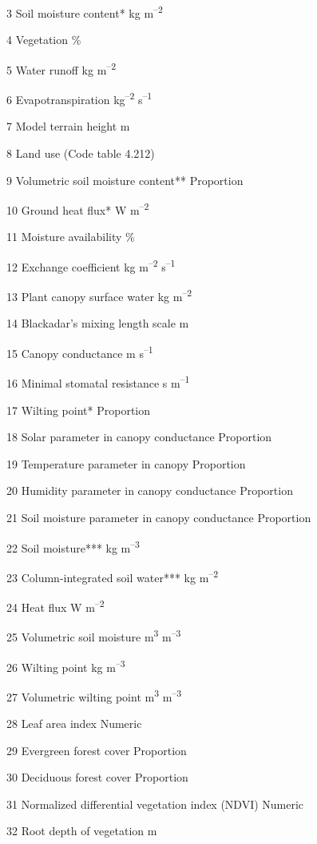 3 Soil moisture content* kg m\textsuperscript{--2}

4 Vegetation \%

5 Water runoff kg m\textsuperscript{--2}

6 Evapotranspiration kg\textsuperscript{--2} s\textsuperscript{--1}

7 Model terrain height m

8 Land use (Code table 4.212)

9 Volumetric soil moisture content** Proportion

10 Ground heat flux* W m\textsuperscript{--2}

11 Moisture availability \%

12 Exchange coefficient kg m\textsuperscript{--2} s\textsuperscript{--1}

13 Plant canopy surface water kg m\textsuperscript{--2}

14 Blackadar's mixing length scale m

15 Canopy conductance m s\textsuperscript{--1}

16 Minimal stomatal resistance s m\textsuperscript{--1}

17 Wilting point* Proportion

18 Solar parameter in canopy conductance Proportion

19 Temperature parameter in canopy Proportion

20 Humidity parameter in canopy conductance Proportion

21 Soil moisture parameter in canopy conductance Proportion

22 Soil moisture*** kg m\textsuperscript{--3}

23 Column-integrated soil water*** kg m\textsuperscript{--2}

24 Heat flux W m\textsuperscript{--2}

25 Volumetric soil moisture m\textsuperscript{3} m\textsuperscript{--3}

26 Wilting point kg m\textsuperscript{--3}

27 Volumetric wilting point m\textsuperscript{3} m\textsuperscript{--3}

28 Leaf area index Numeric

29 Evergreen forest cover Proportion

30 Deciduous forest cover Proportion

31 Normalized differential vegetation index (NDVI) Numeric

32 Root depth of vegetation m

